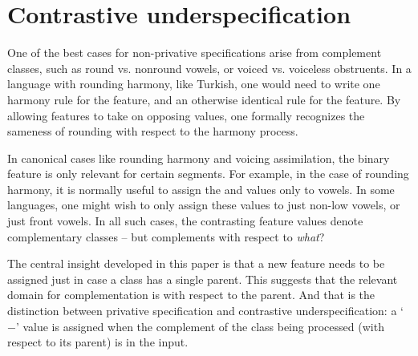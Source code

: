 \documentclass[11pt, oneside]{article}   	%
\begin{document}
\section{Contrastive underspecification}

One of the best cases for non-privative specifications arise from complement classes, such as round vs. nonround vowels, or voiced vs. voiceless obstruents. In a language with rounding harmony, like Turkish, one would need to write one harmony rule for the  feature, and an otherwise identical rule for the  feature. By allowing features to take on opposing values, one formally recognizes the sameness of rounding with respect to the harmony process.

In canonical cases like rounding harmony and voicing assimilation, the binary feature is only relevant for certain segments. For example, in the case of rounding harmony, it is normally useful to assign the  and  values only to vowels. In some languages, one might wish to only assign these values to just non-low vowels, or just front vowels. In all such cases, the contrasting feature values denote complementary classes -- but complements with respect to \textit{what}?

The central insight developed in this paper is that a new feature needs to be assigned just in case a class has a single parent. This suggests that the relevant domain for complementation is with respect to the parent. And that is the distinction between privative specification and contrastive underspecification: a `$-$' value is assigned when the complement of the class being processed (with respect to its parent) is in the input.
\end{document}
